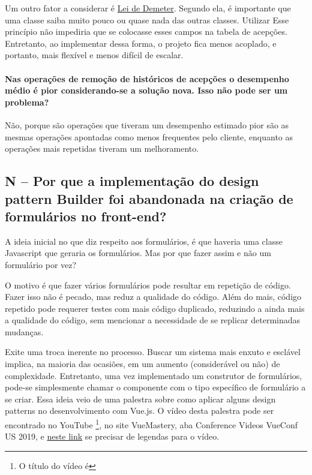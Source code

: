 Um outro fator a considerar é \href{https://pt.wikipedia.org/wiki/Lei_de_Demeter}{Lei de Demeter}. Segundo ela, é
importante que uma classe saiba muito pouco ou quase nada das outras classes. Utilizar Esse princípio não impediria
que se colocasse esses campos na tabela de acepções. Entretanto, ao implementar dessa forma, o projeto fica menos
acoplado, e portanto, mais flexível e menos difícil de escalar.

\paragraph{Nas operações de remoção de históricos de acepções o desempenho médio é pior considerando-se a solução
nova. Isso não pode ser um problema?}

Não, porque são operações que tiveram um desempenho estimado pior são as mesmas operações apontadas como
menos frequentes pelo cliente, enquanto as operações mais repetidas tiveram um melhoramento.

\subsection{N -- Por que a implementação do design pattern Builder foi abandonada na criação de formulários no front-end?}
\label{subsec:nuxt-left-design-pattern-builder}

A ideia inicial no que diz respeito aos formulários, é que haveria uma classe Javascript que geraria os formulários. Mas
por que fazer assim e não um formulário por vez?

O motivo é que fazer vários formulários pode resultar em repetição de código. Fazer isso não é pecado, mas reduz
a qualidade do código. Além do mais, código repetido pode requerer testes com mais código duplicado, reduzindo a ainda
mais a qualidade do código, sem mencionar a necessidade de se replicar determinadas mudanças.

Exite uma troca inerente no processo. Buscar um sistema mais enxuto e esclável implica, na maioria das ocasiões, em um
aumento (considerável ou não) de complexidade. Entretanto, uma vez implementado um construtor de formulários, pode-se
simplesmente chamar o componente com o tipo específico de formulário a se criar. Essa ideia veio de uma palestra sobre
como aplicar alguns design patterns no desenvolvimento com Vue.js. O vídeo desta palestra pode ser encontrado no YouTube
\footnote{O título do vídeo é }, no site VueMastery, aba
Conference Videos \dir VueConf US 2019, e \href{https://read-and-watch.github.io/videos/RF1bbhRw9sg/index.html}{neste link}
se precisar de legendas para o vídeo.

